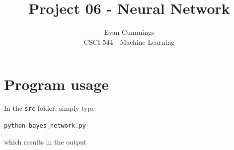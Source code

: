 
\DeclareMathOperator*{\argmax}{arg\,max}

\usepackage[top=.5in, bottom=1in, left=.75in, right=.75in]{geometry}
\usepackage{framed}
\setlength{\columnsep}{8mm}


\small
\twocolumn

\title{Project 06 - Neural Network}
\author{Evan Cummings\\
CSCI 544 - Machine Learning}

\maketitle

\section{Program usage}

In the \texttt{src} folder, simply type

\centerline{\texttt{python bayes\_network.py}}

\noindent which results in the output

